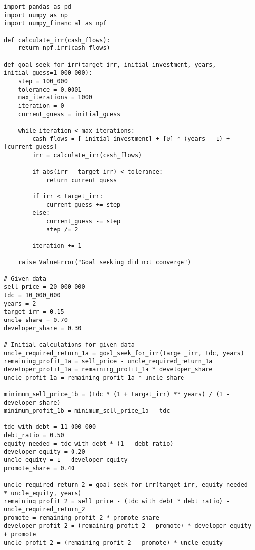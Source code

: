 \documentclass[a1paper]{article}
\begin{document}
\begin{lstlisting}
import pandas as pd
import numpy as np
import numpy_financial as npf

def calculate_irr(cash_flows):
    return npf.irr(cash_flows)

def goal_seek_for_irr(target_irr, initial_investment, years, initial_guess=1_000_000):
    step = 100_000
    tolerance = 0.0001
    max_iterations = 1000
    iteration = 0
    current_guess = initial_guess
    
    while iteration < max_iterations:
        cash_flows = [-initial_investment] + [0] * (years - 1) + [current_guess]
        irr = calculate_irr(cash_flows)
        
        if abs(irr - target_irr) < tolerance:
            return current_guess
        
        if irr < target_irr:
            current_guess += step
        else:
            current_guess -= step
            step /= 2
        
        iteration += 1
    
    raise ValueError("Goal seeking did not converge")

# Given data
sell_price = 20_000_000
tdc = 10_000_000
years = 2
target_irr = 0.15
uncle_share = 0.70
developer_share = 0.30

# Initial calculations for given data
uncle_required_return_1a = goal_seek_for_irr(target_irr, tdc, years)
remaining_profit_1a = sell_price - uncle_required_return_1a
developer_profit_1a = remaining_profit_1a * developer_share
uncle_profit_1a = remaining_profit_1a * uncle_share

minimum_sell_price_1b = (tdc * (1 + target_irr) ** years) / (1 - developer_share)
minimum_profit_1b = minimum_sell_price_1b - tdc

tdc_with_debt = 11_000_000
debt_ratio = 0.50
equity_needed = tdc_with_debt * (1 - debt_ratio)
developer_equity = 0.20
uncle_equity = 1 - developer_equity
promote_share = 0.40

uncle_required_return_2 = goal_seek_for_irr(target_irr, equity_needed * uncle_equity, years)
remaining_profit_2 = sell_price - (tdc_with_debt * debt_ratio) - uncle_required_return_2
promote = remaining_profit_2 * promote_share
developer_profit_2 = (remaining_profit_2 - promote) * developer_equity + promote
uncle_profit_2 = (remaining_profit_2 - promote) * uncle_equity


\end{lstlisting}
\end{document}
